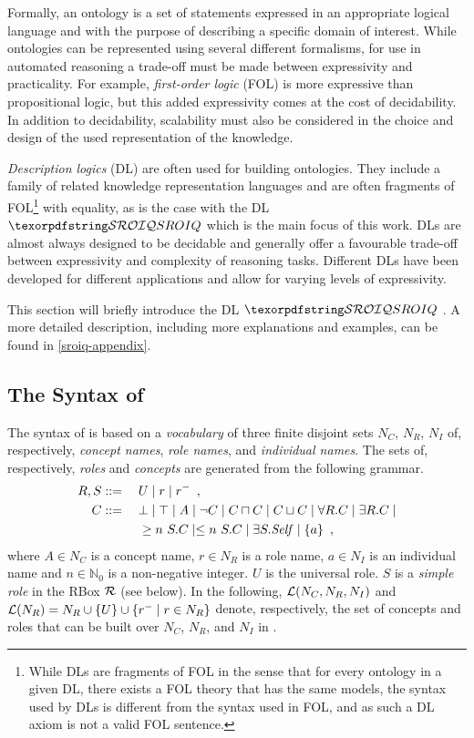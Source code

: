 Formally, an ontology is a set of statements expressed in an appropriate logical language and with the purpose of describing a specific domain of interest. While ontologies can be represented using several different formalisms, for use in automated reasoning a trade-off must be made between expressivity and practicality. For example, \emph{first-order logic} (FOL) is more expressive than propositional logic, but this added expressivity comes at the cost of decidability. In addition to decidability, scalability must also be considered in the choice and design of the used representation of the knowledge.

\emph{Description logics} (DL) are often used for building ontologies. They include a family of related knowledge representation languages and are often fragments of FOL\footnote{While DLs are fragments of FOL in the sense that for every ontology in a given DL, there exists a FOL theory that has the same models, the syntax used by DLs is different from the syntax used in FOL, and as such a DL axiom is not a valid FOL sentence.} with equality, as is the case with the DL $\SROIQ$ which is the main focus of this work. DLs are almost always designed to be decidable and generally offer a favourable trade-off between expressivity and complexity of reasoning tasks. Different DLs have been developed for different applications and allow for varying levels of expressivity.

This section will briefly introduce the DL $\SROIQ$ \cite{horrocks2006even, rudolph2011foundations, baader_horrocks_lutz_sattler_2017}. A more detailed description, including more explanations and examples, can be found in \cref{sroiq-appendix}.

\subsection{The Syntax of \SROIQ} \label{sroiq-syntax}

The syntax of \SROIQ is based on a \emph{vocabulary} of three finite disjoint sets $N_C$, $N_R$, $N_I$ of, respectively, \emph{concept names}, \emph{role names}, and \emph{individual names}. The sets of, respectively, \SROIQ  \emph{roles} and \SROIQ \emph{concepts} are generated from the following grammar.
\begin{alignat*}{2}
  R, S &::={} && U \mid r \mid r^{-} \enspace,\\
  C &::= && \bot \mid \top \mid A \mid \neg C \mid C \sqcap C \mid C \sqcup C \mid \forall R.C \mid \exists R.C \mid \\ 
  &&& \geq n~S.C \mid \leq n~S.C \mid \exists S.\mathit{Self} \mid \{a\} \enspace,
\end{alignat*}
where $A \in N_C$ is a concept name, $r \in N_R$ is a role name, $a \in N_I$ is an individual name and $n \in \mathbb{N}_0$ is a non-negative integer. 
%
$U$ is the universal role. $S$ is a \emph{simple role} in the RBox $\mathcal{R}$ (see below). In the following, $\mathcal{L}(N_C, N_R, N_I)$ and $\mathcal{L}(N_R) = N_R \cup \{U\} \cup \{r^- \mid r \in N_R\}$ denote, respectively, the set of concepts and roles that can be built over $N_C$, $N_R$, and $N_I$ in \SROIQ.

